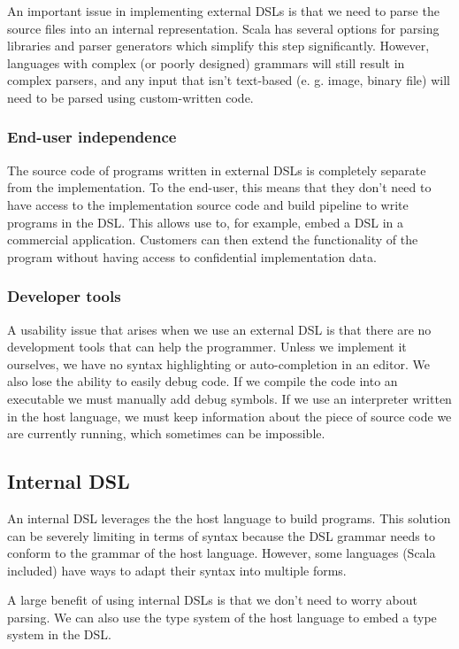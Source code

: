 An important issue in implementing external DSLs is that we need to parse the source files into an internal representation. Scala has several options for parsing libraries and parser generators which simplify this step significantly. However, languages with complex (or poorly designed) grammars will still result in complex parsers, and any input that isn't text-based (e. g. image, binary file) will need to be parsed using custom-written code.

\subsubsection{End-user independence}

The source code of programs written in external DSLs is completely separate from the implementation. To the end-user, this means that they don't need to have access to the implementation source code and build pipeline to write programs in the DSL. This allows use to, for example, embed a DSL in a commercial application. Customers can then extend the functionality of the program without having access to confidential implementation data.

\subsubsection{Developer tools}

A usability issue that arises when we use an external DSL is that there are no development tools that can help the programmer. Unless we implement it ourselves, we have no syntax highlighting or auto-completion in an editor. We also lose the ability to easily debug code. If we compile the code into an executable we must manually add debug symbols. If we use an interpreter written in the host language, we must keep information about the piece of source code we are currently running, which sometimes can be impossible.

\subsection{Internal DSL}

An internal DSL leverages the the host language to build programs. This solution can be severely limiting in terms of syntax because the DSL grammar needs to conform to the grammar of the host language. However, some languages (Scala included) have ways to adapt their syntax into multiple forms.

A large benefit of using internal DSLs is that we don't need to worry about parsing. We can also use the type system of the host language to embed a type system in the DSL.

